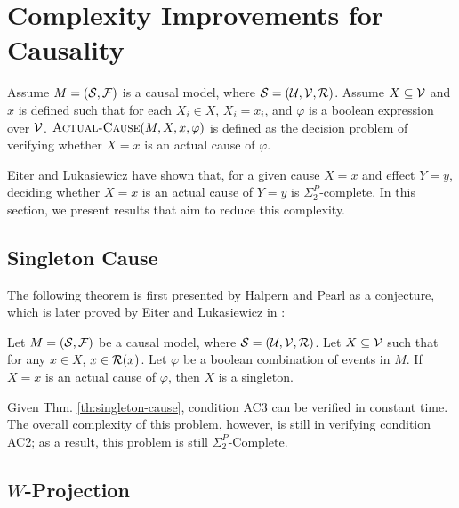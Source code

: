 \section{Complexity Improvements for Causality}

\begin{definition}\label{def:actual-cause-problem}
    Assume $M=(\mathcal{S}, \mathcal{F})$ is a causal model, where 
    $\mathcal{S}=(\mathcal{U}, \mathcal{V}, \mathcal{R})$. Assume
    $X \subseteq \mathcal{V}$ and $x$ is defined such that for 
    each $X_i \in X$, $X_i = x_i$, and $\varphi$ is a boolean 
    expression over $\mathcal{V}$. $\textsc{Actual-Cause}(M, X, x, \varphi)$ is defined 
    as the decision problem of verifying whether $X=x$ is an actual 
    cause of $\varphi$.
\end{definition}

Eiter and Lukasiewicz \cite{eiter2001complexity} have shown that, for
a given cause $X=x$ and effect $Y=y$, deciding whether $X=x$ is an
actual cause of $Y=y$ is $\Sigma_2^P$-complete. In this section, we 
present results that aim to reduce this complexity.

\subsection{Singleton Cause}

The following theorem is first presented by Halpern and Pearl as a 
conjecture, which is later proved by Eiter and Lukasiewicz in 
\cite{eiter2001complexity}:

\begin{theorem}\label{th:singleton-cause}
    Let $M=(\mathcal{S}, \mathcal{F})$ be a causal model, where 
    $\mathcal{S}=(\mathcal{U}, \mathcal{V}, \mathcal{R})$. Let $X \subseteq \mathcal{V}$
    such that for any $x \in X$, $x \in \mathcal{R}(x)$. Let $\varphi$ 
    be a boolean combination of events in $M$. If $X=x$ is an actual 
    cause of $\varphi$, then $X$ is a singleton.
\end{theorem}

Given Thm. \ref{th:singleton-cause}, condition AC3 can be verified
in constant time. The overall complexity of this problem, however, is
still in verifying condition AC2; as a result, this problem is still 
$\Sigma_2^P$-Complete.

\subsection{\texorpdfstring
    {$W$-Projection}
    {\textit{W}-Projection}
}

